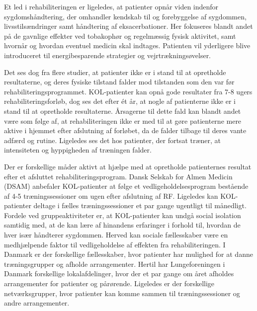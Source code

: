 Et led i rehabiliteringen er ligeledes, at patienter opnår viden indenfor sygdomshåndtering, der omhandler kendskab til og forebyggelse af sygdommen, livsstilsændringer samt håndtering af eksacerbationer.\cite{McCarthy2015,Sundhedsstyrelsen2015} Her fokuseres blandt andet på de gavnlige effekter ved tobakophør og regelmæssig fysisk aktivitet, samt hvornår og hvordan eventuel medicin skal indtages. Patienten vil yderligere blive introduceret til energibesparende strategier og vejrtrækningsøvelser. \cite{McCarthy2015,Sundhedsstyrelsen2015}    

Det ses dog fra flere studier, at patienter ikke er i stand til at opretholde resultaterne, og deres fysiske tilstand falder mod tilstanden som den var før rehabiliteringsprogrammet. \cite{Egan2012, Beauchamp2013, Zanaboni2017,Ringbaek2008} 
KOL-patienter kan opnå gode resultater fra 7-8 ugers rehabiliteringsforløb, dog ses det efter ét år, at nogle af patienterne ikke er i stand til at opretholde resultaterne. \cite{Egan2012, Beauchamp2013} Årsagerne til dette fald kan blandt andet være som følge af, at rehabiliteringen ikke er med til at gøre patienterne mere aktive i hjemmet efter afslutning af forløbet, da de falder tilbage til deres vante adfærd og rutine. \cite{Egan2012} Ligeledes ses det hos patienter, der fortsat træner, at intensiteten og hyppigheden af træningen falder. \cite{Ringbaek2008} 

Der er forskellige måder aktivt at hjælpe med at opretholde patienternes resultat efter et afsluttet rehabiliteringsprogram. Dansk Selskab for Almen Medicin (DSAM) anbefaler KOL-patienter at følge et vedligeholdelsesprogram bestående af 4-5 træningssessioner om ugen efter afslutning af RF. Ligeledes kan KOL-patienter deltage i fælles træningssessioner et par gange ugentligt til månedligt. \cite{dsam2016}
Fordele ved gruppeaktiviteter er, at KOL-patienter kan undgå social isolation samtidig med, at de kan lære af hinandens erfaringer i forhold til, hvordan de hver især håndterer sygdommen. Herved kan sociale fællesskaber være en medhjælpende faktor til vedligeholdelse af effekten fra rehabiliteringen.  \cite{dsam2016} 
I Danmark er der forskellige fællesskaber, hvor patienter har mulighed for at danne træningsgrupper og afholde arrangementer. \cite{Sundhedsstryrrelsen2015} Hertil har Lungeforeningen i Danmark forskellige lokalafdelinger, hvor der et par gange om året afholdes arrangementer for patienter og pårørende. Ligeledes er der forskellige netværksgrupper, hvor patienter kan komme sammen til træningssessioner og andre arrangementer. \cite{Lungeforeningen2016}

